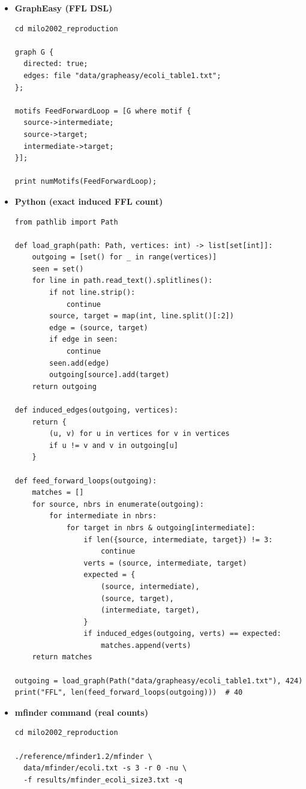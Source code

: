 \documentclass[11pt]{article}
\begin{document}
\begin{itemize}
\item \textbf{GraphEasy (FFL DSL)}
\begin{lstlisting}
cd milo2002_reproduction

graph G {
  directed: true;
  edges: file "data/grapheasy/ecoli_table1.txt";
};

motifs FeedForwardLoop = [G where motif {
  source->intermediate;
  source->target;
  intermediate->target;
}];

print numMotifs(FeedForwardLoop);
\end{lstlisting}

\item \textbf{Python (exact induced FFL count)}
\begin{lstlisting}
from pathlib import Path

def load_graph(path: Path, vertices: int) -> list[set[int]]:
    outgoing = [set() for _ in range(vertices)]
    seen = set()
    for line in path.read_text().splitlines():
        if not line.strip():
            continue
        source, target = map(int, line.split()[:2])
        edge = (source, target)
        if edge in seen:
            continue
        seen.add(edge)
        outgoing[source].add(target)
    return outgoing

def induced_edges(outgoing, vertices):
    return {
        (u, v) for u in vertices for v in vertices
        if u != v and v in outgoing[u]
    }

def feed_forward_loops(outgoing):
    matches = []
    for source, nbrs in enumerate(outgoing):
        for intermediate in nbrs:
            for target in nbrs & outgoing[intermediate]:
                if len({source, intermediate, target}) != 3:
                    continue
                verts = (source, intermediate, target)
                expected = {
                    (source, intermediate),
                    (source, target),
                    (intermediate, target),
                }
                if induced_edges(outgoing, verts) == expected:
                    matches.append(verts)
    return matches

outgoing = load_graph(Path("data/grapheasy/ecoli_table1.txt"), 424)
print("FFL", len(feed_forward_loops(outgoing)))  # 40
\end{lstlisting}

\item \textbf{mfinder command (real counts)}
\begin{lstlisting}
cd milo2002_reproduction

./reference/mfinder1.2/mfinder \
  data/mfinder/ecoli.txt -s 3 -r 0 -nu \
  -f results/mfinder_ecoli_size3.txt -q
\end{lstlisting}
\end{itemize}
\end{document}
